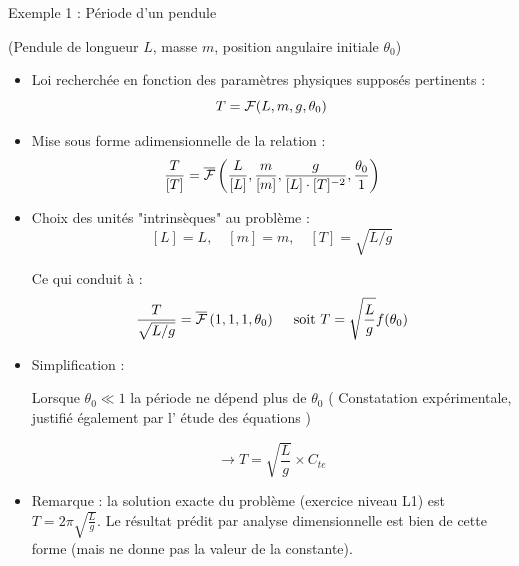 \begin{frame}{ Exemple 1 : Période d'un pendule} 

\small
(Pendule de longueur $L$,  masse $m$, position angulaire initiale $\theta_0$)
\pause

\begin{itemize}

\item Loi recherchée en fonction des paramètres physiques supposés pertinents :
$$
 T = {\cal F} (L,m,g,\theta_0)
$$

\item  Mise sous forme adimensionnelle de la relation :
$$
\frac{T}{[T]} = \overline{\cal F} \left( \frac{L}{[L]},  \frac{m}{[m]},\frac{g}{[L] \cdot [T]^{-2}} ,\frac{\theta_0}{1} \right)
$$

\item Choix des unités "intrinsèques" au problème :
$$
[L] = L, \quad [m] = m , \quad [T] = \sqrt{L/g}
$$

Ce qui conduit à : 
$$
\frac{T}{\sqrt{L/g}} = \overline{\cal F} \left( 1,  1, 1, \theta_0 \right) \quad \mbox{ soit } T = \sqrt{\frac{L}{g}} f(\theta_0)
$$


\item Simplification : 

Lorsque $\theta_0\ll 1$ la période ne dépend plus de $\theta_0$  ({\color{bleu} Constatation expérimentale}, justifié également par l'{\color{red} étude des équations} )

$$ \longrightarrow T = \sqrt{\frac{L}{g}} \times C_{te} $$


\item Remarque : la solution exacte du problème (exercice niveau L1) est $T = 2 \pi  \sqrt{\frac{L}{g}}$. 
Le résultat prédit par analyse dimensionnelle est bien de cette forme (mais ne donne pas la valeur de la constante).

\end{itemize}


\end{frame}




